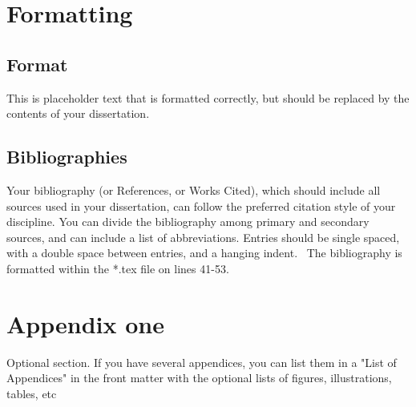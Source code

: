 \documentclass[12pt, draft]{report}
\begin{document}
\chapter{Formatting}
\section{Format}
This is placeholder text that is formatted correctly, but should be replaced by the contents of your dissertation.
\section{Bibliographies}
Your bibliography (or References, or Works Cited), which should include all sources used in your dissertation, can follow the preferred citation style of your discipline. You can divide the bibliography among primary and secondary sources, and can include a list of abbreviations. Entries should be single spaced, with a double space between entries, and a hanging indent.~\cite{schaffner_temporal_2014, alma991013205769704921} The bibliography is formatted within the *.tex file on lines 41-53.
\appendix
\chapter{Appendix one}
Optional section. If you have several appendices, you can list them in a "List of Appendices" in the front matter with the optional lists of figures, illustrations, tables, etc


\singlespacing
\printbibliography[heading=bibintoc, title={Bibliography}]
\end{document}
